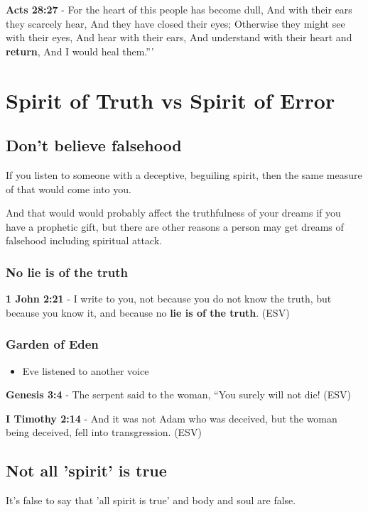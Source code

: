\documentclass[11pt]{article}
\begin{document}
\textbf{Acts 28:27} - For the heart of this people has become dull, And with their ears they scarcely hear, And they have closed their eyes; Otherwise they might see with their eyes, And hear with their ears, And understand with their heart and \textbf{return}, And I would heal them.”’

\section{Spirit of Truth vs Spirit of Error}
\label{sec:org698a5e1}
\subsection{Don't believe falsehood}
\label{sec:org91b80df}
If you listen to someone with a deceptive, beguiling spirit, then the same measure of that would come into you.

And that would would probably affect the truthfulness of your dreams if you have a prophetic gift, but there are other reasons a person may get dreams of falsehood including spiritual attack.

\subsubsection{No lie is of the truth}
\label{sec:org8a2cee1}
\textbf{1 John 2:21} -  I write to you, not because you do not know the truth, but because you know it, and because no \textbf{lie is of the truth}.  (ESV)

\subsubsection{Garden of Eden}
\label{sec:org4eacd51}
\begin{itemize}
\item Eve listened to another voice
\end{itemize}

\textbf{Genesis 3:4} - The serpent said to the woman, “You surely will not die! (ESV)

\textbf{I Timothy 2:14} - And it was not Adam who was deceived, but the woman being deceived, fell into transgression. (ESV)

\subsection{Not all 'spirit' is true}
\label{sec:org50f19fc}
It's false to say that 'all spirit is true' and body and soul are false.
\end{document}
